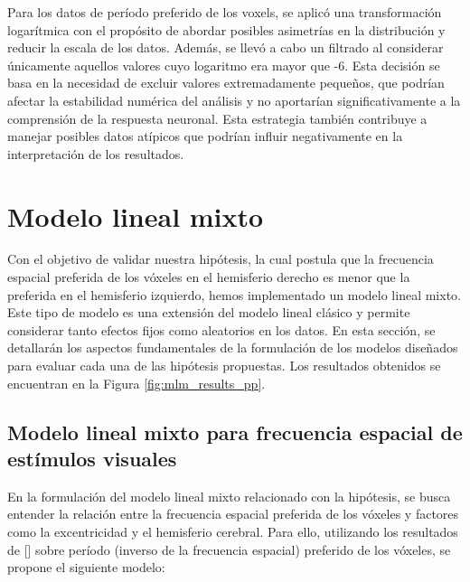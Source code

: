 Para los datos de período preferido de los voxels, se aplicó una transformación logarítmica con el propósito de abordar posibles asimetrías en la distribución y reducir la escala de los datos. Además, se llevó a cabo un filtrado al considerar únicamente aquellos valores cuyo logaritmo era mayor que -6. Esta decisión se basa en la necesidad de excluir valores extremadamente pequeños, que podrían afectar la estabilidad numérica del análisis y no aportarían significativamente a la comprensión de la respuesta neuronal. Esta estrategia también contribuye a manejar posibles datos atípicos que podrían influir negativamente en la interpretación de los resultados.

\section{Modelo lineal mixto}
\label{mlm}
Con el objetivo de validar nuestra hipótesis, la cual postula que la frecuencia espacial preferida de los v\'oxeles en el hemisferio derecho es menor que la preferida en el hemisferio izquierdo, hemos implementado un modelo lineal mixto. Este tipo de modelo es una extensión del modelo lineal clásico y permite considerar tanto efectos fijos como aleatorios en los datos. En esta sección, se detallarán los aspectos fundamentales de la formulación de los modelos diseñados para evaluar cada una de las hipótesis propuestas. Los resultados obtenidos se encuentran en la Figura \ref{fig:mlm_results_pp}.

\subsection{Modelo lineal mixto para frecuencia espacial de est\'imulos visuales}

En la formulación del modelo lineal mixto relacionado con la hip\'otesis, se busca entender la relación entre la frecuencia espacial preferida de los vóxeles y factores como la excentricidad y el hemisferio cerebral. Para ello, utilizando los resultados de [\cite{broderick_mapping_2022}] sobre per\'iodo (inverso de la frecuencia espacial) preferido de los v\'oxeles, se propone el siguiente modelo:

